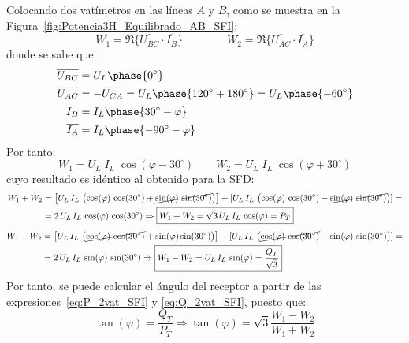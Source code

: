 	Colocando dos vatímetros en las líneas $A$ y $B$, como se muestra en la Figura~\ref{fig:Potencia3H_Equilibrado_AB_SFI}:
	\begin{equation*}
	    W_1=\Re\{\overline{U_{BC}} \cdot \overline{I_B}\}\qquad\qquad W_2=\Re\{\overline{U_{AC}} \cdot \overline{I_A}\}
	\end{equation*}
	donde se sabe que:
	\begin{align*}
	    \overline{U_{BC}}&=U_L\phase{0^\circ}\\
	   \overline{U_{AC}}&=-\overline{U_{CA}}=U_L\phase{120^\circ+180^\circ}=U_L\phase{-60^\circ}\\ \overline{I_B}&=I_L\phase{30^\circ-\varphi} \\  \overline{I_A}&=I_L\phase{-90^\circ-\varphi}
	\end{align*}
	Por tanto: 
	\begin{equation*}
	    W_1=U_L\;I_L\;\cos{(\varphi-30^\circ)}\qquad W_2={U_L}\; {I_L}\;\cos{(\varphi+30^\circ)}
	\end{equation*}
	cuyo resultado es idéntico al obtenido para la SFD: 
\begin{align}\label{eq:P_2vat_SFI}
    W_1+W_2&=\left[ U_L\,I_L\,\left( \cos(\varphi)\,\cos({30^\circ}) + \cancel{\sin(\varphi)\,\sin({30^\circ})}\right) \right] + [U_L\,I_L\,\left( \cos(\varphi)\,\cos({30^\circ}) - \cancel{\sin(\varphi)\,\sin({30^\circ})}\right) ]=\nonumber\\
    &=2\,U_L\,I_L\,\cos(\varphi)\,\cos({30^\circ}) \Rightarrow \boxed{W_1 + W_2 = \sqrt{3}\,U_L\, I_L\,\cos(\varphi) = P_T}
\end{align}
\begin{align}\label{eq:Q_2vat_SFI}
    W_1-W_2&=\left[U_L\,I_L\,\left( \cancel{\cos(\varphi)\,\cos({30^\circ})} + \sin(\varphi)\sin({30^\circ})\right)\right] - [U_L\,I_L\,\left( \cancel{\cos(\varphi)\,\cos({30^\circ})} - \sin(\varphi)\,\sin({30^\circ})\right) ]=\nonumber\\
    &=2\,U_L\,I_L\,\sin(\varphi)\,\sin({30^\circ}) \Rightarrow \boxed{W_1 - W_2 = U_L\, I_L\,\sin(\varphi) = \frac{Q_T}{\sqrt{3}}}
\end{align}
Por tanto, se puede calcular el ángulo del receptor a partir de las expresiones~\eqref{eq:P_2vat_SFI} y \eqref{eq:Q_2vat_SFI}, puesto que:
\begin{equation}
    \tan(\varphi) = \dfrac{Q_T}{P_T}\Rightarrow \boxed{\tan(\varphi) = \sqrt{3} \frac{W_1 - W_2}{W_1 + W_2}}
\end{equation}

